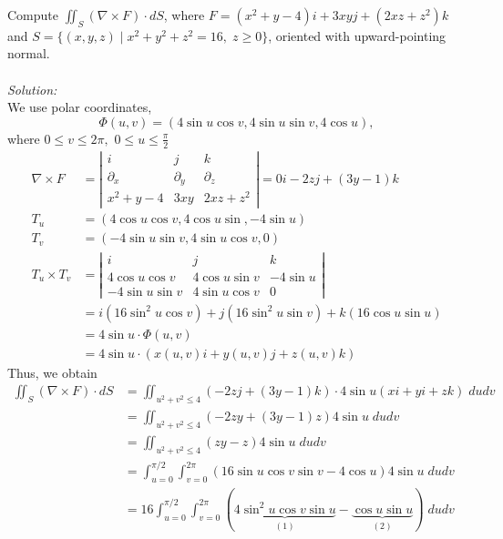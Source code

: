 \documentclass[12pt]{book}
\theoremstyle{definition}
\theoremstyle{remark}
\newcommand\sol{%
  \\ 
  \\
  \textit{Solution:}\\%
}
\begin{document}
\begin{example}Compute $\iint_S (\nabla \times F) \cdot {dS}$, where $F= ( x^2 + y - 4 )i + 3xy j + (2xz + z^2)k $ and $S = \{ (x,y,z) \mid x^ 2 + y^2 + z^2 = 16, \; z \geq 0 \}$, oriented with upward-pointing normal.
  \sol 
  We use polar coordinates,
      $$\Phi (u,v) = (4 \sin u \cos v, 4 \sin u \sin v , 4 \cos u),
 $$ 
  where $0\leq v \leq 2 \pi,$ $ 0\leq u \leq \frac{\pi}{2}  $ 
  \begin{equation*}
    \begin{split}
      \nabla \times F &= \left| \begin{matrix}
        i & j &k \\ \partial_x & \partial_y & \partial_z \\ x^2 + y - 4 & 3xy & 2xz + z^2
      \end{matrix}  \right| = 0 i - 2z j + (3y -1)k \\ 
      T_u &= (4 \cos u \cos v , 4 \cos u \sin , - 4 \sin u) \\ 
      T_v&= (-4 \sin u \sin v, 4 \sin u \cos v , 0)\\ 
      T_u \times T_v &= \left| \begin{matrix}
        i & j & k \\ 4 \cos u \cos v & 4 \cos u \sin v & -4 \sin u \\ -4 \sin u \sin v & 4\sin u \cos v & 0 
      \end{matrix}  \right| \\
      &= i(16 \sin^2 u \cos v) + j(16 \sin ^2 u \sin v ) + k(16 \cos u \sin u)\\ 
      &= 4 \sin u \cdot \Phi (u,v) \\ 
      &= 4 \sin u \cdot (x(u,v)i +y(u,v)j  + z(u,v)k)
    \end{split}
  \end{equation*}
Thus, we obtain 
\begin{equation*}
  \begin{split}
    \iint_S (\nabla \times F) \cdot dS &= \iint_{u^2+ v^2 \leq 4}( -2 zj + (3y-1)k) \cdot 4\sin u(xi + yi + zk) \; dudv\\ &= \iint_{u^2+ v^2 \leq 4} ( -2zy + (3y -1)z )4 \sin u \; du dv \\ 
    &= \iint_{u^2+ v^2 \leq 4} (zy -z) 4 \sin u \; du dv \\ 
    &= \int_{u= 0}^{\pi /2} \int_{v=0}^{2\pi}(16 \sin u \cos v \sin v - 4 \cos u ) 4 \sin u \; du dv \\ 
    &= 16 \int_{u= 0}^{\pi /2} \int_{v=0}^{2\pi} (\underbrace{4 \sin^2 u \cos v \sin u}_{(1)} - \underbrace{\cos u \sin u}_{(2)}) \; du dv 

\end{split}
\end{equation*}
\end{example}
\end{document}
